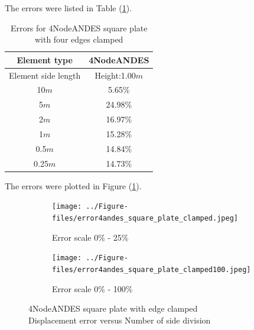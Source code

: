 \documentclass[fleqn,11pt]{article}
\begin{document}
The errors were listed in Table (\ref{table Errors for 4NodeANDES square plate with four edges clamped}).

\begin{table}[H]
  \centering
    \caption{Errors for 4NodeANDES square plate with four edges clamped}
  \label{table Errors for 4NodeANDES square plate with four edges clamped}
\begin{tabular}{|c|c|}
\hline
Element type     & 4NodeANDES          \\ \hline
Element side length & Height:1.00$m$   \\ \hline
10$m$            & 5.65\%         \\ \hline
5$m$             & 24.98\%        \\ \hline
2$m$             & 16.97\%        \\ \hline
1$m$             & 15.28\%        \\ \hline
0.5$m$           & 14.84\%        \\ \hline
0.25$m$          & 14.73\%       \\
\hline
\end{tabular}
\end{table}

The errors were plotted in Figure (\ref{fig 4NodeANDES square plate with edge clamped}).

\begin{figure}[H]
  \begin{subfigure}{0.5\textwidth}
    \centering
    \texttt{[image: ../Figure-files/error4andes\_square\_plate\_clamped.jpeg]}
    \caption{Error scale 0\% - 25\%}
  \end{subfigure}
  \begin{subfigure}{0.5\textwidth}
    \centering
    \texttt{[image: ../Figure-files/error4andes\_square\_plate\_clamped100.jpeg]}
    \caption{Error scale 0\% - 100\%}
  \end{subfigure}
  \captionsetup{justification=centering,margin=2cm}
  \caption{4NodeANDES square plate with edge clamped\\
      Displacement error   versus   Number of side division}
  \label{fig 4NodeANDES square plate with edge clamped}
\end{figure}
\end{document}
